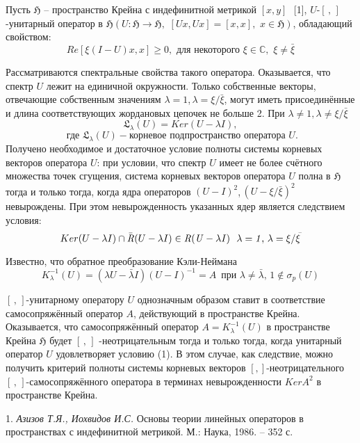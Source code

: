 

\vzmscaption
\sloppy
 Пусть $\mathfrak{H}$ -- пространство Крейна с индефинитной метрикой $[x, y]$ \,\,[1],  $U$-$[ \,, \,]$-унитарный оператор  в $\mathfrak{H}( U:\mathfrak{H}\rightarrow\mathfrak{H},\,\,[Ux, Ux] = [x, x],\,\,x\in \mathfrak{H})$, обладающий свойством:
 \begin{equation}
Re[\xi(I - U)x, x]\geq 0,\,\,\text{для некоторого}\,\, \xi\in \mathbb{C},\,\,\xi\neq\bar{\xi}
\end{equation}

				Рассматриваются спектральные свойства такого оператора. Оказывается, что спектр  $U$ лежит на единичной окружности. Только собственные векторы, отвечающие собственным значениям $\lambda = 1$,\,$\lambda=\xi/\bar{\xi}$, могут иметь присоединённые и длина соответствующих жордановых цепочек не больше 2. При $\lambda\neq 1, \lambda\neq\xi/\bar{\xi}$
 $$
\mathfrak{L}_{\lambda}(U) = Ker (U-\lambda I),$$$$ \,\, \text{где}\,\,\mathfrak{L}_{\lambda}(U) - \text{корневое подпространство оператора}\,\,U.
$$
 Получено необходимое и достаточное условие полноты системы корневых векторов оператора $U$: при условии, что спектр $U$ имеет не более счётного множества точек сгущения, система корневых векторов оператора $U$  полна в $\mathfrak{H}$ тогда и только тогда, когда ядра операторов $(U - I)^2$,\,$(U - \xi/\bar{\xi})^2$  невырождены. При этом невырожденность указанных ядер является следствием условия:
$$
Ker(U - \lambda I)\cap\bar{\it{R}}(U - \lambda I)\in \it{R}(U - \lambda I)\,\,\,\,\lambda = 1,\,\lambda = \xi/\bar{\xi}
$$

		Известно, что обратное преобразование Кэли-Неймана
$$
K^{-1}_{\lambda}(U) = (\lambda U - \bar{\lambda}I)(U - I)^{-1}  = A\,\,\,\text{при}\,\, \lambda\neq \bar{\lambda}, \, 1\notin\sigma_p(U)
$$

$[ \,, \,]$-унитарному оператору $U$ однозначным образом ставит в соответствие самосопряжённый оператор $A$, действующий в пространстве Крейна.  Оказывается, что самосопряжённый оператор $A = K^{-1}_{\lambda}(U)$  в пространстве Крейна $\mathfrak{H}$ будет $[\, , \,]$ -неотрицательным тогда и только тогда, когда унитарный оператор  $U$ удовлетворяет условию (1). В этом случае, как следствие, можно получить критерий  полноты  системы корневых векторов  $[ , ]$-неотрицательного  $[\, ,\, ]$-самосопряжённого оператора в терминах невырожденности  $Ker A^2$ в
пространстве Крейна.



\litlist

1. {\it Азизов Т.Я., Иохвидов И.С.}
 Основы теории линейных операторов в пространствах с индефинитной метрикой. М.: Наука, 1986. – 352 с.
